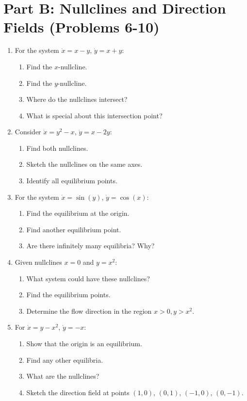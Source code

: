 \documentclass[12pt]{article}
\begin{document}
\section*{Part B: Nullclines and Direction Fields (Problems 6-10)}

\begin{enumerate}[resume]
\item For the system $\dot{x} = x - y$, $\dot{y} = x + y$:
\begin{enumerate}[label=(\alph*)]
    \item Find the $x$-nullcline.
    \item Find the $y$-nullcline.
    \item Where do the nullclines intersect?
    \item What is special about this intersection point?
\end{enumerate}

\item Consider $\dot{x} = y^2 - x$, $\dot{y} = x - 2y$:
\begin{enumerate}[label=(\alph*)]
    \item Find both nullclines.
    \item Sketch the nullclines on the same axes.
    \item Identify all equilibrium points.
\end{enumerate}

\item For the system $\dot{x} = \sin(y)$, $\dot{y} = \cos(x)$:
\begin{enumerate}[label=(\alph*)]
    \item Find the equilibrium at the origin.
    \item Find another equilibrium point.
    \item Are there infinitely many equilibria? Why?
\end{enumerate}

\item Given nullclines $x = 0$ and $y = x^2$:
\begin{enumerate}[label=(\alph*)]
    \item What system could have these nullclines?
    \item Find the equilibrium points.
    \item Determine the flow direction in the region $x > 0, y > x^2$.
\end{enumerate}

\item For $\dot{x} = y - x^2$, $\dot{y} = -x$:
\begin{enumerate}[label=(\alph*)]
    \item Show that the origin is an equilibrium.
    \item Find any other equilibria.
    \item What are the nullclines?
    \item Sketch the direction field at points $(1,0)$, $(0,1)$, $(-1,0)$, $(0,-1)$.
\end{enumerate}
\end{enumerate}
\end{document}
